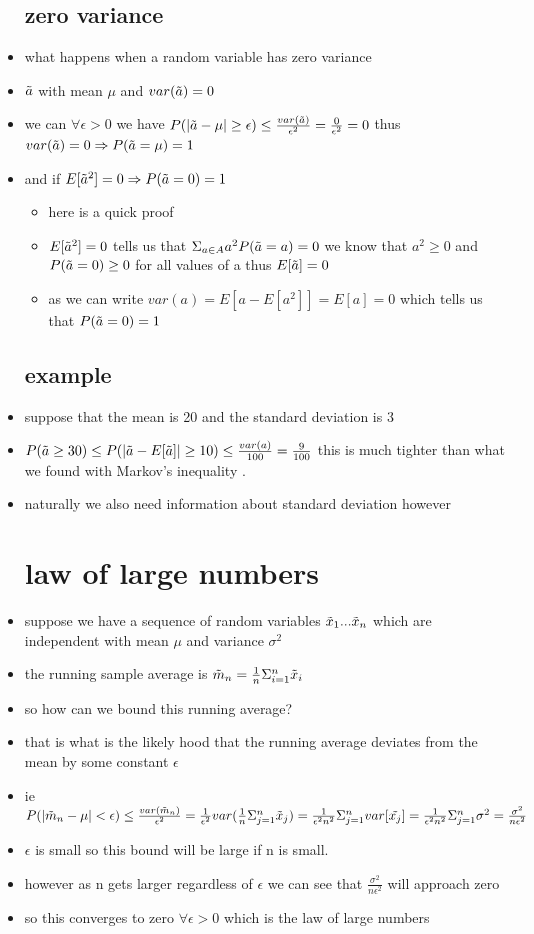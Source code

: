 \documentclass{article}
\begin{document}
\begin{itemize}
\subsection{zero variance}
\item what happens when a random variable has zero variance 
\item $\Tilde{a}$ with mean $\mu$ and $var(\Tilde{a})=0$
\item we can $\forall \epsilon>0$ we have $P(|\Tilde{a}-\mu|\geq\epsilon)\leq \frac{var(\Tilde{a})}{\epsilon^2}=\frac{0}{\epsilon^2}=0$
thus $var(\Tilde{a})=0\Rightarrow P(\Tilde{a}=\mu)=1$
\item and if $E[\Tilde{a}^2]=0 \Rightarrow P(\Tilde{a}=0)=1$
\begin{itemize}
\item here is a quick proof
    \item $E[\Tilde{a}^2]=0$ tells us that $\Sigma_{a\in A}a^2P(\Tilde{a}=a)=0$ we know that $a^2\geq 0$ and $P(\Tilde{a}=0)\geq 0$ for all values of a thus $E[\Tilde{a}]=0$
    \item as we can write $var(a)=E[a-E[a^2]]=E[a]=0$ which tells us that $P(\Tilde{a}=0)=1$
\end{itemize}
\subsection{example}
\item suppose that the mean is 20 and the standard deviation is 3 
\item $P(\Tilde{a}\geq 30)\leq P(|\Tilde{a}-E[\Tilde{a}]|\geq 10)\leq \frac{var(a)}{100}=\frac{9}{100}$ this is much tighter than what we found with Markov's inequality .
\item naturally we also need information about standard deviation however
\section{law of large numbers}
\item suppose we have a sequence of random variables $\Tilde{x}_1...\Tilde{x}_n$ which are independent with mean $\mu$ and variance $\sigma^2$ 
\item the running sample average is $\Tilde{m}_{n}=\frac{1}{n}\Sigma_{i=1}^{n}\Tilde{x}_{i}$
\item so how can we bound this running average? 
\item that is what is the likely hood that the running average deviates from the mean by some constant $\epsilon$
\item ie $P(|\Tilde{m}_{n}-\mu|< \epsilon)\leq \frac{var(\Tilde{m}_{n})}{\epsilon^2}=\frac{1}{\epsilon^2}var(\frac{1}{n}\Sigma_{j=1}^{n}\Tilde{x}_j)=\frac{1}{\epsilon^2n^2}\Sigma_{j=1}^{n}var[\Tilde{x_j}]=\frac{1}{\epsilon^2n^2}\Sigma_{j=1}^{n}\sigma^2=\frac{\sigma^2}{n\epsilon^2}$
\item $\epsilon$ is small so this bound will be large if n is small. 
\item however as n gets larger regardless of $\epsilon$ we can see that $\frac{\sigma^2}{n\epsilon^2}$ will approach zero
\item so this converges to zero $\forall \epsilon>0$ which is the law of large numbers

\end{itemize}
\end{document}
